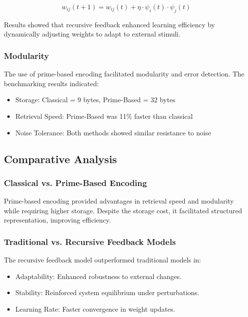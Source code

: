 \documentclass{article}
\theoremstyle{plain}
\begin{document}
\begin{equation}
    w_{ij} (t+1) = w_{ij} (t) + \eta \cdot \psi_i (t) \cdot \psi_j (t)
\end{equation}

Results showed that recursive feedback enhanced learning efficiency by dynamically adjusting weights to adapt to external stimuli.

\subsubsection{Modularity}

The use of prime-based encoding facilitated modularity and error detection. The benchmarking results indicated:

\begin{itemize}
    \item Storage: Classical = 9 bytes, Prime-Based = 32 bytes
    \item Retrieval Speed: Prime-Based was 11\% faster than classical
    \item Noise Tolerance: Both methods showed similar resistance to noise
\end{itemize}

\subsection{Comparative Analysis}

\subsubsection{Classical vs. Prime-Based Encoding}

Prime-based encoding provided advantages in retrieval speed and modularity while requiring higher storage. Despite the storage cost, it facilitated structured representation, improving efficiency.

\subsubsection{Traditional vs. Recursive Feedback Models}

The recursive feedback model outperformed traditional models in:

\begin{itemize}
    \item Adaptability: Enhanced robustness to external changes.
    \item Stability: Reinforced system equilibrium under perturbations.
    \item Learning Rate: Faster convergence in weight updates.
\end{itemize}
\end{document}
